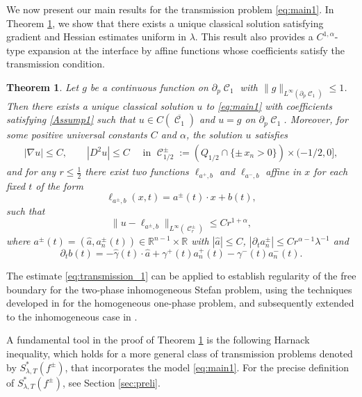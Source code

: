 \documentclass[12pt]{article}
\newtheorem{Theorem}{Theorem}
\numberwithin{Theorem}{section}
\theoremstyle{definition}
\theoremstyle{remark}
\numberwithin{equation}{section}
\DeclareMathOperator{\C}{\mathcal{C}}
\newcommand{\p}{\partial}
\begin{document}
We now present our main results for the transmission problem \eqref{eq:main1}. In Theorem \ref{Thm:C1gamma}, we show that there exists a unique classical solution satisfying gradient and Hessian estimates uniform in $\lambda$. This result also provides a $C^{1,\alpha}$-type expansion at the interface by affine functions whose coefficients satisfy the transmission condition.





\begin{Theorem} \label{Thm:C1gamma}
Let $g$ be a continuous function on $\p_p \C_1$ with $\| g\|_{L^\infty(\p_p \C_1)}\leq 1$. Then there
exists a unique classical solution $u$  to \eqref{eq:main1} with coefficients satisfying \eqref{Assump1} such that $u\in C(\overline{\C_1})$ and $u=g$ on $\p_p \C_1$.
  Moreover, for some positive universal constants $C$ and $\alpha$, the solution $u$ satisfies
    \begin{align} \label{eq:C11}
        |\nabla u|\leq C, \qquad |D^2 u| \leq C \quad \text{ in }\C_{1/2}^\pm:= (Q_{1/2} \cap \{\pm \,x_n >0\}) \times (-1/2,0], 
    \end{align}
    and for any $r \leq \frac{1}{2}$ there exist two functions $\ell_{a^+,b}$ and $\ell_{a^-, b}$   affine in $x$ for each fixed $t$ of the form
    \[
    \ell_{ a^\pm, b}(x,t)=a^{\pm}(t) \cdot x + b(t),
    \] 
    such that
    \begin{equation}\label{eq:transmission_1}
        \| u - \ell_{a^{\pm},b} \|_{L^{\infty}(\C_r^\pm)} \leq C r^{1+{ \alpha}},
    \end{equation}
    where $a^\pm(t)=(\hat a, a_n^\pm(t))\in \mathbb{R}^{n-1}\times\mathbb{R}$ with $|\hat a| \leq C$, $|\p_t a_n^{\pm}| \leq C r^{{ \alpha}-1} \lambda^{-1}$ and
    \[ \p_t b(t) = -\hat{\gamma}(t) \cdot \hat a  + \gamma^+(t) a_n^+(t) - \gamma^-(t) a_n^-(t).\]
\end{Theorem}
 The estimate \eqref{eq:transmission_1} can be applied to establish regularity of the free boundary for the two-phase inhomogeneous Stefan problem, using the techniques developed in \cite{DFS23} for the homogeneous one-phase problem, and subsequently extended to the inhomogeneous case in \cite{ferrari2026free}. 

A fundamental tool in the proof of Theorem \ref{Thm:C1gamma} is the following Harnack inequality, which 
holds for a more general class of transmission problems denoted by $S^*_{\lambda,T}(f^{\pm})$, that incorporates the model \eqref{eq:main1}. For the precise definition of $S^*_{\lambda,T}(f^{\pm})$, see Section \ref{sec:preli}.
\end{document}
